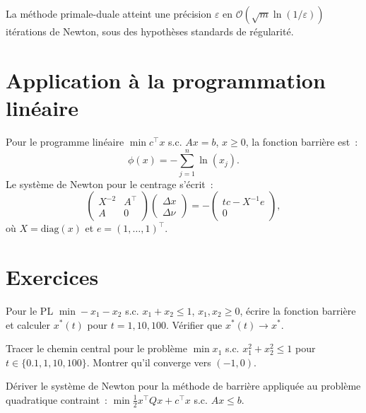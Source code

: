 \begin{theoreme}
La m\'ethode primale-duale atteint une pr\'ecision $\varepsilon$ en
$\mathcal{O}(\sqrt{m} \ln(1/\varepsilon))$ it\'erations de Newton, sous
des hypoth\`eses standards de r\'egularit\'e.
\end{theoreme}

\section{Application \`a la programmation lin\'eaire}

\begin{exemple}
Pour le programme lin\'eaire $\min c^\top x$ s.c. $Ax = b$, $x \geq 0$,
la fonction barri\`ere est~:
\[
  \phi(x) = -\sum_{j=1}^n \ln(x_j).
\]
Le syst\`eme de Newton pour le centrage s'\'ecrit~:
\[
  \begin{pmatrix}
    X^{-2} & A^\top \\
    A & 0
  \end{pmatrix}
  \begin{pmatrix} \Delta x \\ \Delta \nu \end{pmatrix}
  = -\begin{pmatrix} t c - X^{-1} e \\ 0 \end{pmatrix},
\]
o\`u $X = \mathrm{diag}(x)$ et $e = (1, \ldots, 1)^\top$.
\end{exemple}

\section{Exercices}

\begin{exercice}
Pour le PL $\min -x_1 - x_2$ s.c. $x_1 + x_2 \leq 1$, $x_1, x_2 \geq 0$,
\'ecrire la fonction barri\`ere et calculer $x^*(t)$ pour $t = 1, 10, 100$.
V\'erifier que $x^*(t) \to x^*$.
\end{exercice}

\begin{exercice}
Tracer le chemin central pour le probl\`eme $\min x_1$ s.c.
$x_1^2 + x_2^2 \leq 1$ pour $t \in \{0.1, 1, 10, 100\}$. Montrer qu'il
converge vers $(-1, 0)$.
\end{exercice}

\begin{exercice}
D\'eriver le syst\`eme de Newton pour la m\'ethode de barri\`ere appliqu\'ee
au probl\`eme quadratique contraint~:
$\min \frac{1}{2} x^\top Q x + c^\top x$ s.c. $Ax \leq b$.
\end{exercice}

